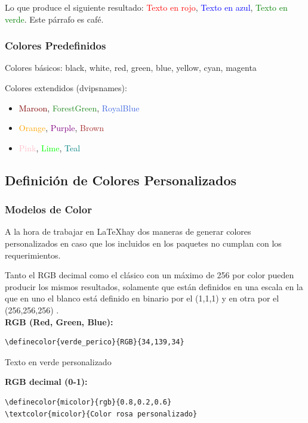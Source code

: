 Lo que produce el siguiente resultado: \textcolor{red}{Texto en rojo}, \textcolor{blue}{Texto en azul}, \textcolor{green}{Texto en verde}. {\color{brown} Este párrafo es café.}

\subsubsection{Colores Predefinidos}
Colores básicos: black, white, red, green, blue, yellow, cyan, magenta

Colores extendidos (dvipsnames): 
\begin{itemize}
    \item \textcolor{Maroon}{Maroon}, \textcolor{ForestGreen}{ForestGreen}, \textcolor{RoyalBlue}{RoyalBlue}
    \item \textcolor{Orange}{Orange}, \textcolor{Purple}{Purple}, \textcolor{Brown}{Brown}
    \item \textcolor{Pink}{Pink}, \textcolor{Lime}{Lime}, \textcolor{Teal}{Teal}
\end{itemize}

\subsection{Definición de Colores Personalizados}

\subsubsection{Modelos de Color}
A la hora de trabajar en \LaTeX hay dos maneras de generar colores personalizados en caso que los incluidos en los paquetes no cumplan con los requerimientos.

Tanto el RGB decimal como el clásico con un máximo de 256 por color pueden producir los mismos resultados, solamente que están definidos en una escala en la que en uno el blanco está definido en binario por el (1,1,1) y en otra por el (256,256,256) \cite{latex_fontguide}.\\

\textbf{RGB (Red, Green, Blue):}
\begin{verbatim}
\definecolor{verde_perico}{RGB}{34,139,34}
\end{verbatim}

\textcolor{verde_perico}{Texto en verde personalizado}

\textbf{RGB decimal (0-1):}
\begin{verbatim}
\definecolor{micolor}{rgb}{0.8,0.2,0.6}
\textcolor{micolor}{Color rosa personalizado}
\end{verbatim}

